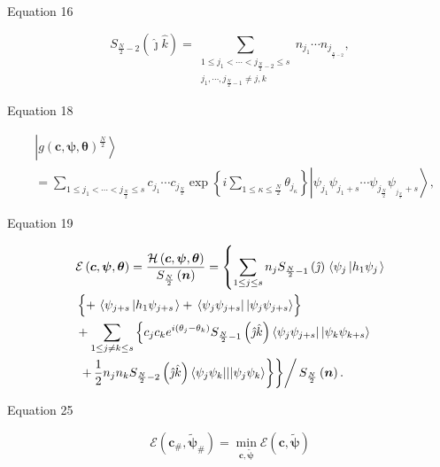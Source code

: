 \documentclass[aps]{revtex4}%
\begin{document}
Equation 16%

\[
S_{\frac{N}{2}-2}\left(  \hat{\jmath}\hat{k}\right)  =\sum_{\substack{1\leq
j_{1}<\cdots<j_{\frac{N}{2}-2}\leq s\\j_{1},\cdots,j_{\frac{N}{2}-1}\neq
j,k}}n_{j_{1}}\cdots n_{j_{_{\frac{N}{2}-2}}},
\]


Equation 18%

\begin{align*}
&  \left\vert g\left(  \boldsymbol{c},\boldsymbol{\psi},\boldsymbol{\theta
}\right)  ^{\frac{N}{2}}\right\rangle \\
&  =\sum_{1\leq j_{1}<\cdots<j_{\frac{N}{2}}\leq s}c_{j_{1}}\cdots
c_{j_{\frac{N}{2}}}\exp\left\{  i\sum\limits_{1\leq\kappa\leq\frac{N}{2}%
}\theta_{j_{\kappa}}\right\}  \left\vert \psi_{j_{1}}\psi_{j_{1}+s}\cdots
\psi_{j_{\frac{N}{2}}}\psi_{_{j_{\frac{N}{2}}}+s}\right\rangle ,
\end{align*}


Equation 19%

\begin{align*}
&  \mathcal{E}\left(  \boldsymbol{c},\boldsymbol{\psi},\boldsymbol{\theta
}\right)  =\frac{\mathcal{H}\left(  \boldsymbol{c},\boldsymbol{\psi
},\boldsymbol{\theta}\right)  }{S_{\frac{N}{2}}\left(  \boldsymbol{n}\right)
}=\left\{  \sum_{1\leq j\leq s}n_{j}S_{\frac{N}{2}-1}\left(  \hat{\jmath
}\right)  \right.  \left\langle \psi_{j}\left\vert h_{1}\psi_{j}\right.
\right\rangle \\
&  \left\{  \overset{}{+\,\left\langle \psi_{j+s}\left\vert h_{1}\psi
_{j+s}\right.  \right\rangle }+\,\left\langle \psi_{j}\psi_{j+s}\right\vert
\left\vert \psi_{j}\psi_{j+s}\right\rangle \right\} \\
&  +\sum_{1\leq j\neq k\leq s}\left\{  c_{j}c_{k}e^{i\left(  \theta_{j}%
-\theta_{k}\right)  }S_{\frac{N}{2}-1}\left(  \hat{\jmath}\hat{k}\right)
\left\langle \psi_{j}\psi_{j+s}\right\vert \left\vert \psi_{k}\psi
_{k+s}\right\rangle \right. \\
&  \left.  \left.  \left.  +\,\frac{1}{2}\overset{}{n_{j}n_{k}S_{\frac{N}%
{2}-2}\left(  \hat{\jmath}\hat{k}\right)  \left\langle \psi_{j}\psi_{k}%
|||\psi_{j}\psi_{k}\right\rangle }\right\}  \right\}  \right/  S_{\frac{N}{2}%
}\left(  \boldsymbol{n}\right)  .
\end{align*}


Equation 25%

\[
\mathcal{E}\left(  \boldsymbol{c}_{\#},\boldsymbol{\tilde{\psi}}_{\#}\right)
=\min_{\boldsymbol{c},\boldsymbol{\tilde{\psi}}}\mathcal{E}\left(
\boldsymbol{c},\boldsymbol{\tilde{\psi}}\right)
\]
\end{document}
